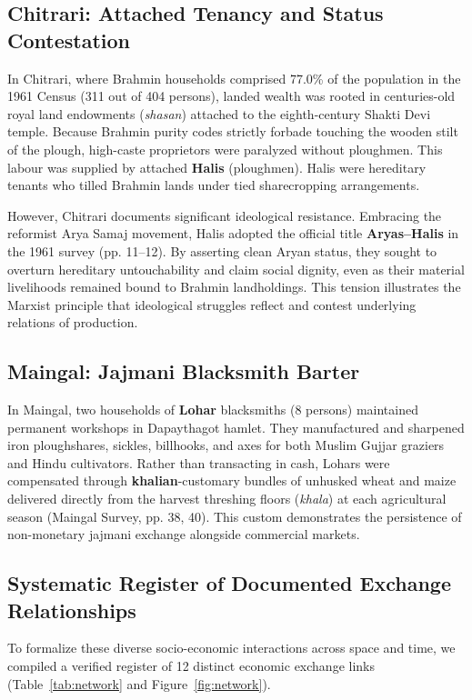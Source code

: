 \documentclass[11pt,a4paper]{article}
\begin{document}
\subsection{Chitrari: Attached Tenancy and Status Contestation}
In Chitrari, where Brahmin households comprised 77.0\% of the population in the 1961 Census (311 out of 404 persons), landed wealth was rooted in centuries-old royal land endowments (\textit{shasan}) attached to the eighth-century Shakti Devi temple. Because Brahmin purity codes strictly forbade touching the wooden stilt of the plough, high-caste proprietors were paralyzed without ploughmen. This labour was supplied by attached \textbf{Halis} (ploughmen). Halis were hereditary tenants who tilled Brahmin lands under tied sharecropping arrangements. 

However, Chitrari documents significant ideological resistance. Embracing the reformist Arya Samaj movement, Halis adopted the official title \textbf{Aryas--Halis} in the 1961 survey (pp. 11--12). By asserting clean Aryan status, they sought to overturn hereditary untouchability and claim social dignity, even as their material livelihoods remained bound to Brahmin landholdings. This tension illustrates the Marxist principle that ideological struggles reflect and contest underlying relations of production.

\subsection{Maingal: Jajmani Blacksmith Barter}
In Maingal, two households of \textbf{Lohar} blacksmiths (8 persons) maintained permanent workshops in Dapaythagot hamlet. They manufactured and sharpened iron ploughshares, sickles, billhooks, and axes for both Muslim Gujjar graziers and Hindu cultivators. Rather than transacting in cash, Lohars were compensated through \textbf{khalian}-customary bundles of unhusked wheat and maize delivered directly from the harvest threshing floors (\textit{khala}) at each agricultural season (Maingal Survey, pp. 38, 40). This custom demonstrates the persistence of non-monetary jajmani exchange alongside commercial markets.

\subsection{Systematic Register of Documented Exchange Relationships}
To formalize these diverse socio-economic interactions across space and time, we compiled a verified register of 12 distinct economic exchange links (Table~\ref{tab:network} and Figure~\ref{fig:network}).
\end{document}
